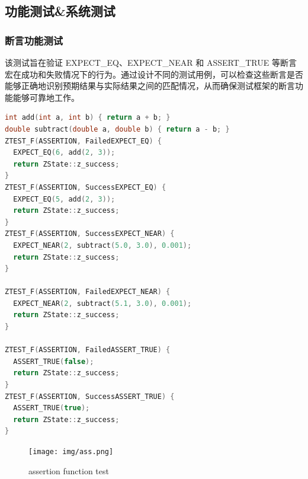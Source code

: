 \documentclass{article}
\begin{document}
\subsection{功能测试\&系统测试}
\subsubsection{断言功能测试}
该测试旨在验证 EXPECT\_EQ、EXPECT\_NEAR 和 ASSERT\_TRUE 等断言宏在成功和失败情况下的行为。通过设计不同的测试用例，可以检查这些断言是否能够正确地识别预期结果与实际结果之间的匹配情况，从而确保测试框架的断言功能能够可靠地工作。
\begin{framed}
    \begin{lstlisting}[language=C++]
int add(int a, int b) { return a + b; }
double subtract(double a, double b) { return a - b; }
ZTEST_F(ASSERTION, FailedEXPECT_EQ) {
  EXPECT_EQ(6, add(2, 3));
  return ZState::z_success;
}
ZTEST_F(ASSERTION, SuccessEXPECT_EQ) {
  EXPECT_EQ(5, add(2, 3));
  return ZState::z_success;
}
ZTEST_F(ASSERTION, SuccessEXPECT_NEAR) {
  EXPECT_NEAR(2, subtract(5.0, 3.0), 0.001);
  return ZState::z_success;
}

ZTEST_F(ASSERTION, FailedEXPECT_NEAR) {
  EXPECT_NEAR(2, subtract(5.1, 3.0), 0.001);
  return ZState::z_success;
}

ZTEST_F(ASSERTION, FailedASSERT_TRUE) {
  ASSERT_TRUE(false);
  return ZState::z_success;
}
ZTEST_F(ASSERTION, SuccessASSERT_TRUE) {
  ASSERT_TRUE(true);
  return ZState::z_success;
}
\end{lstlisting}
\end{framed}
\begin{figure}[H]
    \centering
    \texttt{[image: img/ass.png]} %
    \caption{ assertion function test}
    \label{fig:assertion function test}
\end{figure}
\end{document}

